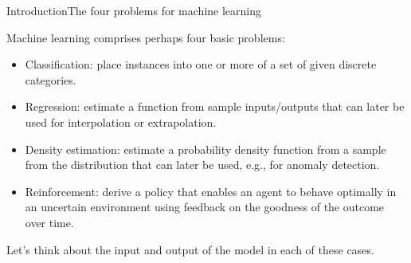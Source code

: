 \documentclass{beamer}
\begin{document}
\begin{frame}{Introduction}{The four problems for machine learning}

  Machine learning comprises perhaps four basic problems:
  \begin{itemize}
  \item \alert{Classification}: place instances into one or more of a
    set of given discrete \alert{categories}.
  \item \alert{Regression}: estimate a function from sample
    inputs/outputs that can later be used for \alert{interpolation} or
    \alert{extrapolation}.
  \item \alert{Density estimation}: estimate a probability density
    function from a sample from the distribution that can later be used,
    e.g., for \alert{anomaly detection}.
  \item \alert{Reinforcement}: derive a \alert{policy} that enables an
    agent to behave optimally in an uncertain environment using
    \alert{feedback} on the goodness of the outcome over time.
  \end{itemize}

  \medskip

  Let's think about the input and output of the model in each of these
  cases.
  
\end{frame}
\end{document}
